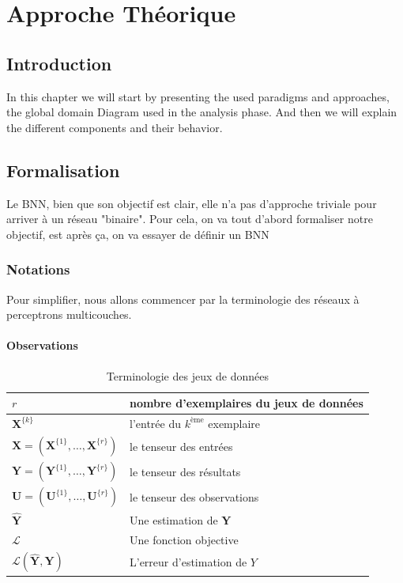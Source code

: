 \chapter{Approche Théorique}
\section{Introduction}

In this chapter we will start by presenting the used paradigms and approaches, the global domain Diagram used in the analysis phase. And then we will explain the different components and their behavior.

\section{Formalisation}\cite{4}
Le BNN, bien que son objectif est clair, elle n'a pas d'approche triviale pour arriver à un réseau "binaire". Pour cela, on va tout d'abord formaliser notre objectif, est après ça, on va essayer de définir un BNN

\subsection{Notations}
Pour simplifier, nous allons commencer par la terminologie des réseaux à perceptrons multicouches.
\pagebreak
\subsubsection{Observations}\label{Theoretical:Observations}
\begin{table}[ht]
	\centering
	\begin{tabularx}{\textwidth}{| X | X |}
		\hline
		$r$ & nombre d'exemplaires du jeux de données \\ 
		\hline
		$\boldsymbol{X}^{\{k\}}$ & l'entrée du $k^\text{ème}$ exemplaire \\
		\hline
		$\boldsymbol{X}=\left(\boldsymbol{X}^{\{1\}},\dots, \boldsymbol{X}^{\{r\}}\right)$ & le tenseur des entrées \\
		\hline
		$\boldsymbol{Y}=\left(\boldsymbol{Y}^{\{1\}},\dots, \boldsymbol{Y}^{\{r\}}\right)$ & le tenseur des résultats \\
		\hline
		$\boldsymbol{U}=\left(\boldsymbol{U}^{\{1\}},\dots, \boldsymbol{U}^{\{r\}}\right)$ & le tenseur des observations \\
		\hline
		
		$\hat{\boldsymbol{Y}}$                    & Une estimation de $\boldsymbol{Y}$      \\ 
		\hline 
		$\mathcal{L}$                    & Une fonction objective      \\ 
		\hline 
		$\mathcal{L}(\hat{\boldsymbol{Y}},\boldsymbol{Y})$                    & L'erreur d'estimation de $Y$       \\ 
		\hline 
	\end{tabularx}
	\caption{Terminologie des jeux de données}
	\label{table:Datasets}

\end{table}

